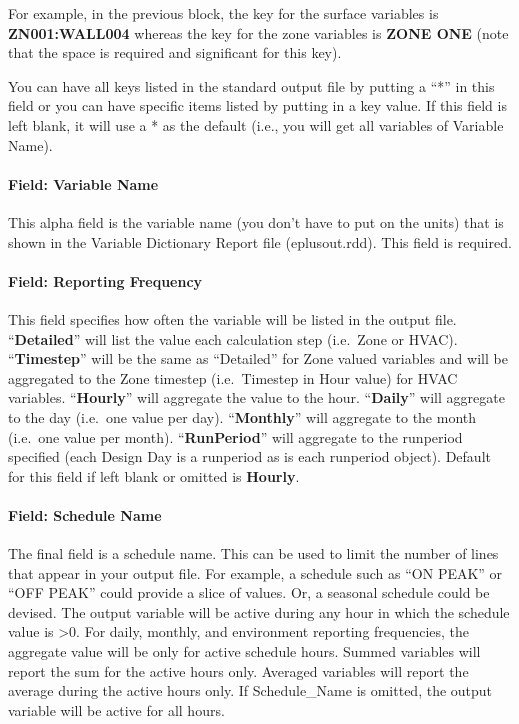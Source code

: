 For example, in the previous block, the key for the surface variables is \textbf{ZN001:WALL004} whereas the key for the zone variables is \textbf{ZONE ONE} (note that the space is required and significant for this key).

You can have all keys listed in the standard output file by putting a ``*'' in this field or you can have specific items listed by putting in a key value. If this field is left blank, it will use a * as the default (i.e., you will get all variables of Variable Name).

\paragraph{Field: Variable Name}\label{field-variable-name}

This alpha field is the variable name (you don't have to put on the units) that is shown in the Variable Dictionary Report file (eplusout.rdd). This field is required.

\paragraph{Field: Reporting Frequency}\label{field-reporting-frequency}

This field specifies how often the variable will be listed in the output file. ``\textbf{Detailed}'' will list the value each calculation step (i.e.~Zone or HVAC). ``\textbf{Timestep}'' will be the same as ``Detailed'' for Zone valued variables and will be aggregated to the Zone timestep (i.e.~Timestep in Hour value) for HVAC variables. ``\textbf{Hourly}'' will aggregate the value to the hour. ``\textbf{Daily}'' will aggregate to the day (i.e.~one value per day). ``\textbf{Monthly}'' will aggregate to the month (i.e.~one value per month). ``\textbf{RunPeriod}'' will aggregate to the runperiod specified (each Design Day is a runperiod as is each runperiod object). Default for this field if left blank or omitted is \textbf{Hourly}.

\paragraph{Field: Schedule Name}\label{field-schedule-name-004}

The final field is a schedule name. This can be used to limit the number of lines that appear in your output file. For example, a schedule such as ``ON PEAK'' or ``OFF PEAK'' could provide a slice of values. Or, a seasonal schedule could be devised. The output variable will be active during any hour in which the schedule value is \textgreater{}0. For daily, monthly, and environment reporting frequencies, the aggregate value will be only for active schedule hours. Summed variables will report the sum for the active hours only. Averaged variables will report the average during the active hours only. If Schedule\_Name is omitted, the output variable will be active for all hours.

